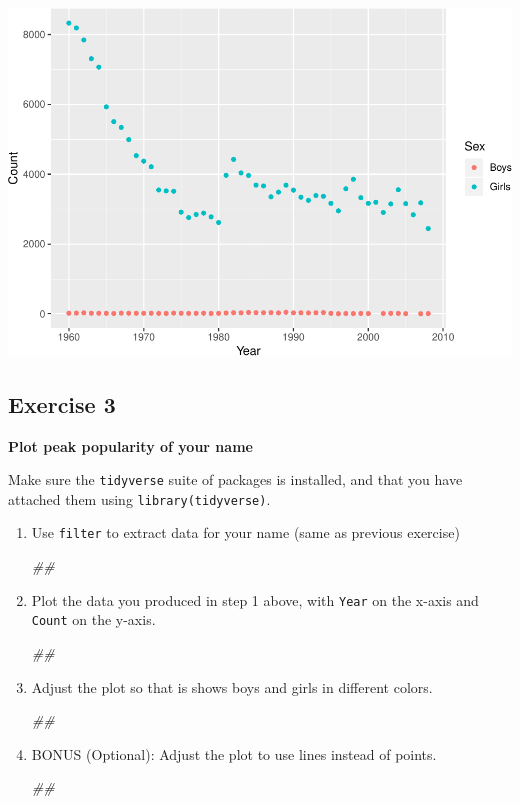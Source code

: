\documentclass[
]{book}
\newenvironment{Shaded}{\begin{snugshade}}{\end{snugshade}}
\newcommand{\CommentTok}[1]{\textcolor[rgb]{0.56,0.35,0.01}{\textit{#1}}}
\begin{document}
\includegraphics{R/Rintro/figures/unnamed-chunk-34-1.pdf}

\hypertarget{exercise-3}{%
\subsection{Exercise 3}\label{exercise-3}}

\textbf{Plot peak popularity of your name}

Make sure the \texttt{tidyverse} suite of packages is installed, and that you
have attached them using \texttt{library(tidyverse)}.

\begin{enumerate}
\def\labelenumi{\arabic{enumi}.}
\item
  Use \texttt{filter} to extract data for your name (same as previous exercise)

\begin{Shaded}
\begin{Highlighting}[]
\CommentTok{##}
\end{Highlighting}
\end{Shaded}
\item
  Plot the data you produced in step 1 above, with \texttt{Year} on the x-axis
  and \texttt{Count} on the y-axis.

\begin{Shaded}
\begin{Highlighting}[]
\CommentTok{##}
\end{Highlighting}
\end{Shaded}
\item
  Adjust the plot so that is shows boys and girls in different colors.

\begin{Shaded}
\begin{Highlighting}[]
\CommentTok{##}
\end{Highlighting}
\end{Shaded}
\item
  BONUS (Optional): Adjust the plot to use lines instead of points.

\begin{Shaded}
\begin{Highlighting}[]
\CommentTok{##}
\end{Highlighting}
\end{Shaded}
\end{enumerate}
\end{document}
